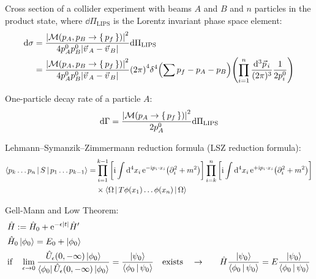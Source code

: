 		\noindent
		Cross section of a collider experiment with beams $A$ and $B$ and $n$ particles in the product state, where $\dd \Pi_\mathrm{LIPS}$ is the Lorentz invariant phase space element:
		\begin{equation}
			\begin{aligned}
				\dd \sigma
				&= \frac{\abs{\mathcal{M}(p_A,p_B \to\set{p_f})}^2}{4p_A^0 p_B^0 \abs{\vec{v}_A - \vec{v}_B}} \dd \Pi_\mathrm{LIPS} \\
				&= \frac{\abs{\mathcal{M}(p_A,p_B \to\set{p_f})}^2}{4p_A^0 p_B^0 \abs{\vec{v}_A - \vec{v}_B}}  \qty(2\pi)^4 \delta^4 \qty(\sum p_{f} - p_A - p_B) \qty(\prod_{i=1}^{n} \frac{\dd[3] \vec{p}_i}{(2 \pi)^3} \frac{1}{2 p_i^0})
			\end{aligned}
		\end{equation}

		\noindent
		One-particle decay rate of a particle $A$:
		\begin{equation}
			\dd \Gamma = \frac{\abs{\mathcal{M}(p_A \to\set{p_f})}^2}{2 p_A^0} \dd \Pi_\mathrm{LIPS}
		\end{equation}

		\noindent
		Lehmann--Symanzik--Zimmermann reduction formula (LSZ reduction formula):
		\begin{equation}
			\begin{aligned}
				\Braket{p_k \hdots p_n|S|p_1 \hdots p_{k-1}} = &\prod_{i=1}^{k-1} \qty[\mathrm{i} \int \dd[4]{x_i} \mathrm{e}^{-\mathrm{i} p_i\cdot x_i} \qty(\partial^2_i+m^2)] \prod_{i=k}^{n} \qty[\mathrm{i} \int \dd[4]{x_i} \mathrm{e}^{+\mathrm{i} p_i\cdot x_i} \qty(\partial^2_i+m^2)] \\
				&\times\Braket{\Omega|T \phi(x_1) \hdots \phi(x_n)|\Omega}
			\end{aligned}
		\end{equation}

		\noindent
		Gell-Mann and Low Theorem:
		\begin{equation}
			\begin{aligned}
				&\hat{H} := \hat{H}_0 + \mathrm{e}^{-\epsilon \abs{t}} \hat{H}' \\
				&\hat{H}_0 \Ket{\phi_0} = E_0 + \Ket{\phi_0} \\
				&\text{if}\quad \lim_{\epsilon\to 0} \frac{\hat{U}_\epsilon(0,-\infty)\Ket{\phi_0}}{\Bra{\phi_0} \hat{U}_\epsilon(0,-\infty)\Ket{\phi_0}}
				= \frac{\Ket{\psi_0}}{\Braket{\phi_0|\psi_0}} \quad\text{exists}\quad
				\to&\quad \hat{H} \frac{\Ket{\psi_0}}{\Braket{\phi_0|\psi_0}} = E \frac{\Ket{\psi_0}}{\Braket{\phi_0|\psi_0}} \\
			\end{aligned}
		\end{equation}

